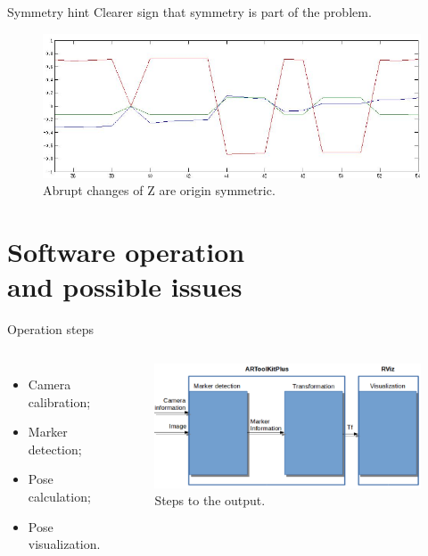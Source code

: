 \documentclass[10pt]{beamer}
\begin{document}

\begin{frame}[fragile]{Symmetry hint}
  Clearer sign that symmetry is part of the problem.
    \begin{figure}
      \centering
      \includegraphics[scale=0.35]{zoomat50}
      \caption{Abrupt changes of Z are origin symmetric.}
    \end{figure}

  \end{frame}


\section{Software operation \\ and possible issues}


\begin{frame}[fragile]{Operation steps}
  \begin{columns}
      \begin{itemize}
        \item Camera calibration;
        \item Marker detection;
        \item Pose calculation;
        \item Pose visualization.
      \end{itemize}
      \begin{figure}
        \centering
        \includegraphics[scale=0.25]{softwarediagram}
        \caption{Steps to the output.}
      \end{figure}
  \end{columns}
\end{frame}
\end{document}
